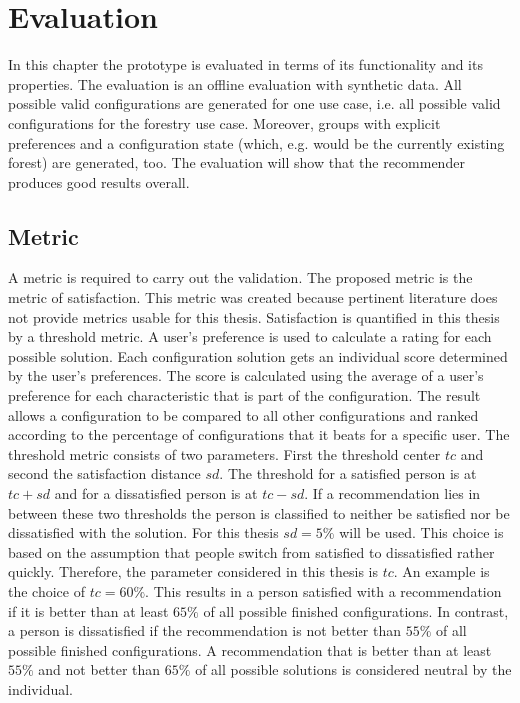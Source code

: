\chapter{Evaluation}
\label{ch:Evaluation}

In this chapter the prototype is evaluated in terms of its functionality and its properties. The evaluation is an offline evaluation with synthetic data. All possible valid configurations are generated for one use case, i.e. all possible valid configurations for the forestry use case. Moreover, groups with explicit preferences and a configuration state (which, e.g. would be the currently existing forest) are generated, too. The evaluation will show that the recommender produces good results overall.

\section{Metric}
\label{sec:Evaluation:Metrics}

A metric is required to carry out the validation. The proposed metric is the metric of satisfaction. This metric was created because pertinent literature does not provide metrics usable for this thesis. Satisfaction is quantified in this thesis by a threshold metric. A user's preference is used to calculate a rating for each possible solution. Each configuration solution gets an individual score determined by the user's preferences. The score is calculated using the average of a user's preference for each characteristic that is part of the configuration. The result allows a configuration to be compared to all other configurations and ranked according to the percentage of configurations that it beats for a specific user. The threshold metric consists of two parameters. First the threshold center $tc$ and second the satisfaction distance $sd$. The threshold for a satisfied person is at $tc + sd$ and for a dissatisfied person is at $tc - sd$. If a recommendation lies in between these two thresholds the person is classified to neither be satisfied nor be dissatisfied with the solution. For this thesis $sd=5\%$ will be used. This choice is based on the assumption that people switch from satisfied to dissatisfied rather quickly. Therefore, the parameter considered in this thesis is $tc$. An example is the choice of $tc = 60\%$. This results in a person satisfied with a recommendation if it is better than at least $65\%$ of all possible finished configurations. In contrast, a person is dissatisfied if the recommendation is not better than $55\%$ of all possible finished configurations. A recommendation that is better than at least $55\%$ and not better than $65\%$ of all possible solutions is considered neutral by the individual.

